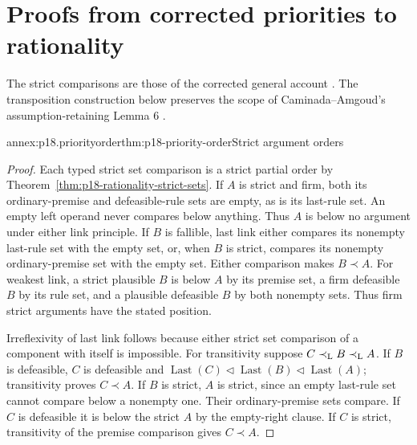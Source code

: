 \section{Proofs from corrected priorities to rationality}
\label{sec:annex-p18-structured-priority-rationality}

The strict comparisons are those of the corrected general account
\cite{ModgilPrakken2013GeneralCorrected}. The transposition construction
below preserves the scope of Caminada--Amgoud's assumption-retaining
Lemma 6 \cite{CaminadaAmgoud2007Evaluation}.

\begin{annexitem}{annex:p18.priorityorder}{thm:p18-priority-order}{Strict argument orders}
\begin{proof}
Each typed strict set comparison is a strict partial order by
Theorem~\ref{thm:p18-rationality-strict-sets}.
If \(A\) is strict and firm, both its ordinary-premise and defeasible-rule
sets are empty, as is its last-rule set. An empty left operand never
compares below anything. Thus \(A\) is below no argument under either
link principle.
If \(B\) is fallible, last link either compares its nonempty last-rule
set with the empty set, or, when \(B\) is strict, compares its nonempty
ordinary-premise set with the empty set. Either comparison makes
\(B\prec A\).
For weakest link, a strict plausible \(B\) is below \(A\) by its
premise set, a firm defeasible \(B\) by its rule set, and a plausible
defeasible \(B\) by both nonempty sets. Thus firm strict arguments
have the stated position.

Irreflexivity of last link follows because either strict set comparison
of a component with itself is impossible.
For transitivity suppose \(C\prec_{\rm L}B\prec_{\rm L}A\).
If \(B\) is defeasible, \(C\) is defeasible and
\(\operatorname{Last}(C)\triangleleft\operatorname{Last}(B)
\triangleleft\operatorname{Last}(A)\); transitivity proves \(C\prec A\).
If \(B\) is strict, \(A\) is strict, since an empty last-rule set
cannot compare below a nonempty one. Their ordinary-premise sets compare.
If \(C\) is defeasible it is below the strict \(A\) by the empty-right
clause. If \(C\) is strict, transitivity of the premise comparison
gives \(C\prec A\).


\end{proof}
\end{annexitem}
